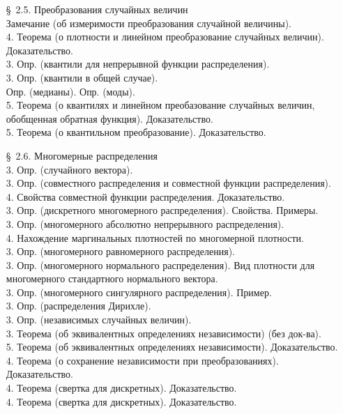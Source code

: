 \documentclass[10pt]{amsart}
\begin{document}
\begin{enumerate}
\begin{enumerate}
\item[\S\, 2.5.] Преобразования случайных величин \\
Замечание (об измеримости преобразования случайной величины). \\
4. Теорема (о плотности и линейном преобразование случайных величин). Доказательство. \\
3.  Опр. (квантили для непрерывной функции распределения). \\
3.  Опр. (квантили в общей случае). \\
Опр. (медианы).   Опр. (моды). \\
5.   Теорема (о квантилях и линейном преобазование случайных величин, обобщенная обратная функция). Доказательство. \\
5. Теорема (о квантильном преобразование). Доказательство. \\

    
\item[\S\, 2.6.] Многомерные распределения \\
3. Опр. (случайного вектора). \\
3. Опр. (совместного распределения и  совместной функции распределения). \\
4. Свойства совместной функции распределения. Доказательство. \\
3. Опр. (дискретного многомерного распределения). Свойства. Примеры. \\
3. Опр. (многомерного абсолютно непрерывного распределения). \\
4. Нахождение маргинальных плотностей по многомерной плотности. \\
3. Опр. (многомерного равномерного распределения). \\
3. Опр. (многомерного нормального распределения). Вид плотности для многомерного стандартного нормального вектора. \\ 
3. Опр. (многомерного сингулярного распределения). Пример. \\
3. Опр. (распределения Дирихле). \\
3. Опр. (независимых случайных величин). \\
3. Теорема (об эквивалентных определениях независимости) (без док-ва). \\
5. Теорема (об эквивалентных определениях независимости). Доказательство. \\
4. Теорема (о сохранение независимости при преобразованиях). Доказательство. \\ 
4. Теорема (свертка для дискретных). Доказательство. \\
4. Теорема (свертка для дискретных).  Доказательство. \\
\end{enumerate}
    

\end{enumerate}
\end{document}
